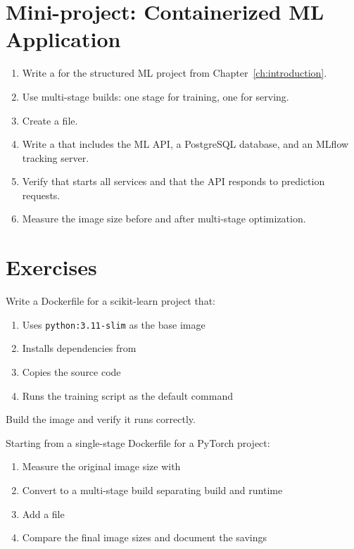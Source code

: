 \section{Mini-project: Containerized ML Application}
\label{sec:mini-project-ch7}

\begin{miniproject}[title=\textbf{Mini-project 7: Docker for ML}]
\begin{enumerate}
  \item Write a  for the structured ML project from
    Chapter~\ref{ch:introduction}.
  \item Use multi-stage builds: one stage for training, one for
    serving.
  \item Create a  file.
  \item Write a  that includes the ML API,
    a PostgreSQL database, and an MLflow tracking server.
  \item Verify that  starts all services and
    that the API responds to prediction requests.
  \item Measure the image size before and after multi-stage
    optimization.
\end{enumerate}
\end{miniproject}

\section{Exercises}
\label{sec:exercises-ch7}

\begin{exercise}
Write a Dockerfile for a scikit-learn project that:
\begin{enumerate}
  \item Uses \texttt{python:3.11-slim} as the base image
  \item Installs dependencies from 
  \item Copies the source code
  \item Runs the training script as the default command
\end{enumerate}
Build the image and verify it runs correctly.
\end{exercise}

\begin{exercise}
Starting from a single-stage Dockerfile for a PyTorch project:
\begin{enumerate}
  \item Measure the original image size with 
  \item Convert to a multi-stage build separating build and runtime
  \item Add a  file
  \item Compare the final image sizes and document the savings
\end{enumerate}
\end{exercise}

